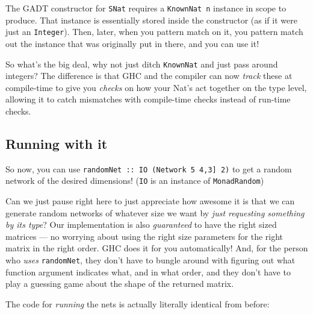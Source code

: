 \documentclass[]{article}
\begin{document}
The GADT constructor for \texttt{SNat} requires a \texttt{KnownNat\ n} instance
in scope to produce. That instance is essentially stored inside the constructor
(as if it were just an \texttt{Integer}). Then, later, when you pattern match on
it, you pattern match out the instance that was originally put in there, and you
can use it!

So what's the big deal, why not just ditch \texttt{KnownNat} and just pass
around integers? The difference is that GHC and the compiler can now
\emph{track} these at compile-time to give you \emph{checks} on how your Nat's
act together on the type level, allowing it to catch mismatches with
compile-time checks instead of run-time checks.

\hypertarget{running-with-it}{%
\subsection{Running with it}\label{running-with-it}}

So now, you can use
\texttt{randomNet\ ::\ IO\ (Network\ 5\ \textquotesingle{}{[}4,3{]}\ 2)} to get
a random network of the desired dimensions! (\texttt{IO} is an instance of
\texttt{MonadRandom})

Can we just pause right here to just appreciate how awesome it is that we can
generate random networks of whatever size we want by \emph{just requesting
something by its type}? Our implementation is also \emph{guaranteed} to have the
right sized matrices --- no worrying about using the right size parameters for
the right matrix in the right order. GHC does it for you automatically! And, for
the person who \emph{uses} \texttt{randomNet}, they don't have to bungle around
with figuring out what function argument indicates what, and in what order, and
they don't have to play a guessing game about the shape of the returned matrix.

The code for \emph{running} the nets is actually literally identical from
before:
\end{document}
